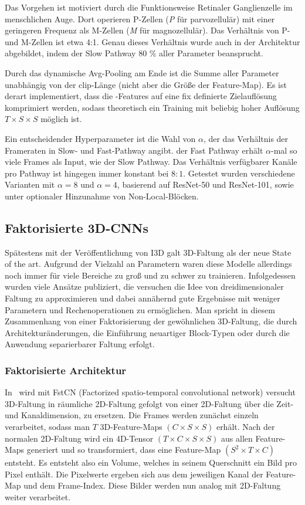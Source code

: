 Das Vorgehen ist motiviert durch die Funktionsweise Retinaler Ganglienzelle im menschlichen Auge.
Dort operieren P-Zellen (\emph{P} für parvozellulär) mit einer geringeren Frequenz als M-Zellen (\emph{M} für magnozellulär).
Das Verhältnis von P- und M-Zellen ist etwa 4:1.
Genau dieses Verhältnis wurde auch in der Architektur abgebildet, indem der Slow Pathway 80 \% aller Parameter beansprucht.

Durch das dynamische Avg-Pooling am Ende ist die Summe aller Parameter unabhängig von der \gls{clip}-Länge (nicht aber die Größe der Feature-Map).
Es ist derart implementiert, dass die \conv-Features auf eine fix definierte Zielauflösung komprimiert werden, sodass theoretisch ein Training mit beliebig hoher Auflösung $T \times S \times S$ möglich ist.

Ein entscheidender Hyperparameter ist die Wahl von $\alpha$, der das Verhältnis der Frameraten in Slow- und Fast-Pathway angibt.
\Dh der Fast Pathway erhält $\alpha$-mal so viele Frames als Input, wie der Slow Pathway.
Das Verhältnis verfügbarer Kanäle pro Pathway ist hingegen immer konstant bei $8:1$.
Getestet wurden verschiedene Varianten mit $\alpha = 8$ und $\alpha = 4$, basierend auf ResNet-50 und ResNet-101, sowie unter optionaler Hinzunahme von Non-Local-Blöcken.

\subsection{Faktorisierte 3D-CNNs}
\label{subsec:factorized-convolution}

Spätestens mit der Veröffentlichung von I3D galt 3D-Faltung als der neue State of the art.
Aufgrund der Vielzahl an Parametern waren diese Modelle allerdings noch immer für viele Bereiche zu groß und zu schwer zu trainieren.
Infolgedessen wurden viele Ansätze publiziert, die versuchen die Idee von dreidimensionaler Faltung zu approximieren und dabei annähernd gute Ergebnisse mit weniger Parametern und Rechenoperationen zu ermöglichen.
Man spricht in diesem Zusammenhang von einer Faktorisierung der gewöhnlichen 3D-Faltung, die durch Architekturänderungen, die Einführung neuartiger Block-Typen oder durch die Anwendung separierbarer Faltung erfolgt.

\subsubsection{Faktorisierte Architektur}

In~\cite{Sun15} wird mit FstCN (Factorized spatio-temporal convolutional network) versucht 3D-Faltung in räumliche 2D-Faltung gefolgt von einer 2D-Faltung über die Zeit- und Kanaldimension, zu ersetzen.
Die Frames werden zunächst einzeln verarbeitet, sodass man ${T}$ 3D-Feature-Maps $(C \times S \times S)$ erhält.
Nach der normalen 2D-Faltung wird ein 4D-Tensor $(T \times C \times S \times S)$ aus allen Feature-Maps generiert und so transformiert, dass eine Feature-Map $(S^2 \times T \times C)$ entsteht.
Es entsteht also ein Volume, welches in seinem Querschnitt ein Bild pro Pixel enthält.
Die Pixelwerte ergeben sich aus dem jeweiligen Kanal der Feature-Map und dem Frame-Index.
Diese Bilder werden nun analog mit 2D-Faltung weiter verarbeitet.


